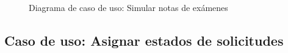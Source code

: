 \documentclass[12pt,a4paper]{article}
\begin{document}
\begin{figure}[H]
  \centering
  \caption{Diagrama de caso de uso: Simular notas de exámenes}
  \label{fig:diagusoSimularNotas}
\end{figure}

\subsection{Caso de uso: Asignar estados de solicitudes}
\end{document}
